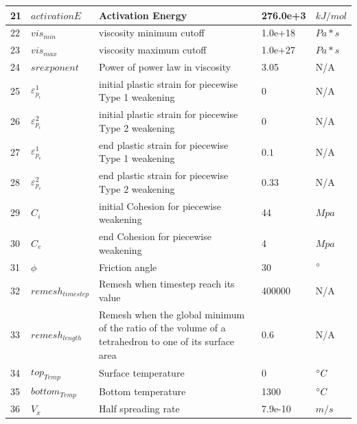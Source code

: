 \begin{table}[h]
\begin{tabular}[h]{l l p{6.8cm} l l}
\hline
21   &  $activationE$    &    Activation Energy      & 276.0e+3   & $kJ/mol$  \\
\hline
22   &  $vis_{min}$    &    viscosity minimum cutoff      & 1.0e+18   & $Pa*s$  \\
\hline
23   &  $vis_{max}$    &    viscosity maximum cutoff      & 1.0e+27   & $Pa*s$  \\
\hline
24   &  $srexponent$    &    Power of power law in viscosity       & 3.05   & N/A  \\
\hline
25   &  $\varepsilon_{p_{i}}^{1}$    &    initial plastic strain for piecewise Type 1 weakening       & $0$   & N/A  \\
\hline
26   &  $\varepsilon_{p_{i}}^{2}$    &    initial plastic strain for piecewise Type 2 weakening       & $0$   & N/A  \\
\hline
27   &  $\varepsilon_{p_{e}}^{1}$    &    end plastic strain for piecewise Type 1 weakening       & $0.1$   & N/A  \\
\hline
28   &  $\varepsilon_{p_{e}}^{2}$    &    end plastic strain for piecewise Type 2 weakening       & $0.33$   & N/A  \\
\hline
29   &  $C_{i}$    &    initial Cohesion for piecewise weakening       & 44   & $Mpa$  \\
\hline
30   &  $C_{e}$    &    end Cohesion for piecewise weakening       & 4   & $Mpa$  \\
\hline
31   &  $\phi$    &    Friction angle      & 30   & $\degree$  \\
\hline
32   &  $remesh_{timestep}$    &    Remesh when timestep reach its value      & 400000   & N/A  \\
\hline
33   &  $remesh_{length}$    &    Remesh when the global minimum of the ratio of the volume of a tetrahedron to one of its surface area      & 0.6   & N/A  \\
\hline
34   &  $top_{Temp}$    &    Surface temperature      & 0   & $\degree C$  \\
\hline
35   &  $bottom_{Temp}$    &    Bottom temperature      & 1300   & $\degree C$  \\
\hline
36   &  $V_{x}$    &    Half spreading rate      & 7.9e-10   & $m/s$  \\

\hline
\hline
\end{tabular}

\label{Tab_ModelParameters}
\end{table}



